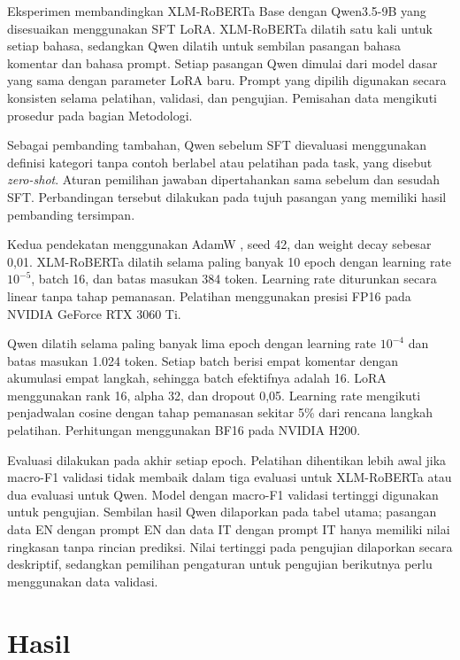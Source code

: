 \documentclass[11pt]{article}
\begin{document}
Eksperimen membandingkan XLM-RoBERTa Base dengan Qwen3.5-9B yang disesuaikan menggunakan SFT LoRA. XLM-RoBERTa dilatih satu kali untuk setiap bahasa, sedangkan Qwen dilatih untuk sembilan pasangan bahasa komentar dan bahasa prompt. Setiap pasangan Qwen dimulai dari model dasar yang sama dengan parameter LoRA baru. Prompt yang dipilih digunakan secara konsisten selama pelatihan, validasi, dan pengujian. Pemisahan data mengikuti prosedur pada bagian Metodologi.

Sebagai pembanding tambahan, Qwen sebelum SFT dievaluasi menggunakan definisi kategori tanpa contoh berlabel atau pelatihan pada task, yang disebut \textit{zero-shot}. Aturan pemilihan jawaban dipertahankan sama sebelum dan sesudah SFT. Perbandingan tersebut dilakukan pada tujuh pasangan yang memiliki hasil pembanding tersimpan.

Kedua pendekatan menggunakan AdamW \citep{loshchilov-hutter-2019-decoupled}, seed 42, dan weight decay sebesar 0,01. XLM-RoBERTa dilatih selama paling banyak 10 epoch dengan learning rate $10^{-5}$, batch 16, dan batas masukan 384 token. Learning rate diturunkan secara linear tanpa tahap pemanasan. Pelatihan menggunakan presisi FP16 pada NVIDIA GeForce RTX 3060 Ti.

Qwen dilatih selama paling banyak lima epoch dengan learning rate $10^{-4}$ dan batas masukan 1.024 token. Setiap batch berisi empat komentar dengan akumulasi empat langkah, sehingga batch efektifnya adalah 16. LoRA menggunakan rank 16, alpha 32, dan dropout 0,05. Learning rate mengikuti penjadwalan cosine dengan tahap pemanasan sekitar 5\% dari rencana langkah pelatihan. Perhitungan menggunakan BF16 pada NVIDIA H200.

Evaluasi dilakukan pada akhir setiap epoch. Pelatihan dihentikan lebih awal jika macro-F1 validasi tidak membaik dalam tiga evaluasi untuk XLM-RoBERTa atau dua evaluasi untuk Qwen. Model dengan macro-F1 validasi tertinggi digunakan untuk pengujian. Sembilan hasil Qwen dilaporkan pada tabel utama; pasangan data EN dengan prompt EN dan data IT dengan prompt IT hanya memiliki nilai ringkasan tanpa rincian prediksi. Nilai tertinggi pada pengujian dilaporkan secara deskriptif, sedangkan pemilihan pengaturan untuk pengujian berikutnya perlu menggunakan data validasi.

\section{Hasil}
\end{document}
